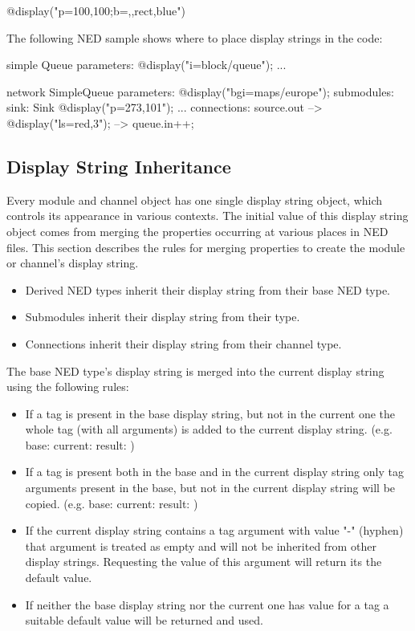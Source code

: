 \begin{ned}
@display("p=100,100;b=,,rect,blue")
\end{ned}

The following NED sample shows where to place display strings in the code:

\begin{ned}
simple Queue
{
    parameters:
        @display("i=block/queue");
    ...
}

network SimpleQueue
{
    parameters:
        @display("bgi=maps/europe");
    submodules:
        sink: Sink {
            @display("p=273,101");
        }
        ...
    connections:
        source.out --> { @display("ls=red,3"); } --> queue.in++;
}
\end{ned}

\subsection{Display String Inheritance}

Every module and channel object has one single display string object,
which controls its appearance in various contexts. The initial value of
this display string object comes from merging the 
properties occurring at various places in NED files.
This section describes the rules for merging  properties
to create the module or channel's display string.

\begin{itemize}
  \item Derived NED types inherit their display string from their base NED type.
  \item Submodules inherit their display string from their type.
  \item Connections inherit their display string from their channel type.
\end{itemize}

The base NED type's display string is merged into the current display string
using the following rules:

\begin{itemize}
  \item If a tag is present in the base display string, but not in the current one
        the whole tag (with all arguments) is added to the current display string.
        (e.g. base:  current:  result: )
  \item If a tag is present both in the base and in the current display string
        only tag arguments present in the base, but not in the current display string
        will be copied.
        (e.g. base:  current:  result: )
  \item If the current display string contains a tag argument with value "-" (hyphen)
        that argument is treated as empty and will not be inherited from other
        display strings. Requesting the value of this argument will return its the
        default value.
  \item If neither the base display string nor the current one has value for a tag
        a suitable default value will be returned and used.
\end{itemize}

